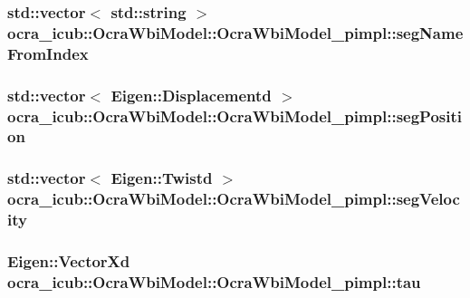 \hypertarget{structOcraWbiModel_1_1OcraWbiModel__pimpl_ad1592df54a2ce8043dc2bc050fd61905}{
\subsubsection[{seg\-Name\-From\-Index}]{\setlength{\rightskip}{0pt plus 5cm}std\-::vector$<$ std\-::string $>$ {\bf ocra\-\_\-icub\-::\-Ocra\-Wbi\-Model\-::\-Ocra\-Wbi\-Model\-\_\-pimpl\-::seg\-Name\-From\-Index}}}\label{structOcraWbiModel_1_1OcraWbiModel__pimpl_ad1592df54a2ce8043dc2bc050fd61905}
\hypertarget{structOcraWbiModel_1_1OcraWbiModel__pimpl_a47b0a577b990fa7db3bc04a7a8107c31}{
\subsubsection[{seg\-Position}]{\setlength{\rightskip}{0pt plus 5cm}std\-::vector$<$ \-Eigen\-::\-Displacementd $>$ {\bf ocra\-\_\-icub\-::\-Ocra\-Wbi\-Model\-::\-Ocra\-Wbi\-Model\-\_\-pimpl\-::seg\-Position}}}\label{structOcraWbiModel_1_1OcraWbiModel__pimpl_a47b0a577b990fa7db3bc04a7a8107c31}
\hypertarget{structOcraWbiModel_1_1OcraWbiModel__pimpl_a6e95ae9d994aa67c9a2fc4021f80bb54}{
\subsubsection[{seg\-Velocity}]{\setlength{\rightskip}{0pt plus 5cm}std\-::vector$<$ \-Eigen\-::\-Twistd $>$ {\bf ocra\-\_\-icub\-::\-Ocra\-Wbi\-Model\-::\-Ocra\-Wbi\-Model\-\_\-pimpl\-::seg\-Velocity}}}\label{structOcraWbiModel_1_1OcraWbiModel__pimpl_a6e95ae9d994aa67c9a2fc4021f80bb54}
\hypertarget{structOcraWbiModel_1_1OcraWbiModel__pimpl_a3dc9c0b3d43f7406a6b89bd2a2af5642}{
\subsubsection[{tau}]{\setlength{\rightskip}{0pt plus 5cm}\-Eigen\-::\-Vector\-Xd {\bf ocra\-\_\-icub\-::\-Ocra\-Wbi\-Model\-::\-Ocra\-Wbi\-Model\-\_\-pimpl\-::tau}}}\label{structOcraWbiModel_1_1OcraWbiModel__pimpl_a3dc9c0b3d43f7406a6b89bd2a2af5642}
